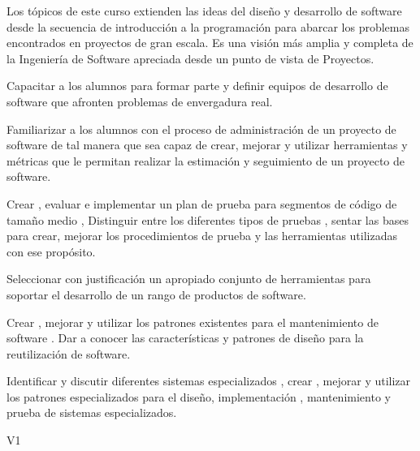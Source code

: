 \begin{syllabus}


\begin{justification}
	Los tópicos de este curso extienden las ideas del diseño y desarrollo de software desde la secuencia de introducción
	a la programación para abarcar los problemas encontrados en proyectos de gran escala. Es una visión más amplia y
	completa de la Ingenierí­a de Software apreciada desde un punto de vista de Proyectos.
	\end{justification}
	
	\begin{goals}
		\item Capacitar a los alumnos para formar parte y definir equipos de desarrollo de software que afronten problemas de envergadura real.
		\item Familiarizar a los alumnos con el proceso de administración de un proyecto de software de tal manera que sea capaz de crear, mejorar y utilizar herramientas y métricas que le permitan realizar la estimación y seguimiento de un proyecto de software.
		\item Crear , evaluar e implementar un plan de prueba para segmentos de código de tamaño medio , Distinguir entre los diferentes tipos de pruebas , sentar las bases para crear, mejorar los procedimientos de prueba y las herramientas utilizadas con ese propósito.
		\item Seleccionar con justificación un apropiado conjunto de herramientas para soportar el desarrollo de un rango de productos de software.
		\item Crear , mejorar y utilizar los patrones existentes para el mantenimiento de software . Dar a conocer las caracterí­sticas y patrones de diseño para la reutilización de software.
		\item Identificar y discutir diferentes sistemas especializados , crear , mejorar y utilizar los patrones especializados para el diseño, implementación , mantenimiento y prueba de sistemas especializados.
	\end{goals}
	
	\begin{outcomes}{V1}
		\item {}
		\item {}
		\item {}
		\item {}
		\item {}
	\end{outcomes}
	

\end{syllabus}
